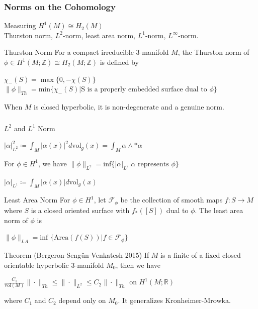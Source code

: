 \documentclass[t]{beamer}
\newcommand{\R}{\mathbb{R}}
\newcommand{\ds}{\displaystyle}
\newcommand{\vol}{\text{vol}}
\begin{document}
\begin{frame}[t]
\frametitle{Norms on the Cohomology}
Measuring $H^1(M) \cong H_2(M)$\\
Thurston norm, $L^2$-norm, least area norm, $L^1$-norm, $L^{\infty}$-norm. 

\begin{block}{Thurston Norm} 
	For a compact irreducible $3$-manifold $M$, the Thurston norm of $\phi \in H^1(M; \mathbb{Z}) \cong H_2(M; \mathbb{Z})$ is defined by 
	\begin{center}
		$\chi_- (S)= \max\{0, -\chi(S)\}$
		$\| \phi \|_{Th}= \text{min}\{\chi_- (S)| \text{S is a properly embedded surface dual to } \phi \}$
	\end{center}
	When $M$ is closed hyperbolic, it is non-degenerate and a genuine norm.
\end{block}
\end{frame}

\begin{frame}[t]
	\frametitle{}
	\begin{block}{$L^2$ and $L^1$ Norm}
		
		\begin{center}
			$\ds |\alpha |_{L^2}^2 \coloneqq \int_M |\alpha(x)|^2 d \text{vol}_g(x) =\int_M \alpha \wedge *\alpha $
		\end{center}
		\begin{center}
			For $\phi \in H^1$, we have $\| \phi  \|_{L^2}= \ds \text{inf} \{ |\alpha |_{L^2}|\alpha \text{ represents } \phi \}$
		\end{center}
	\begin{center}
		$\ds |\alpha |_{L^1} \coloneqq \int_M |\alpha(x)| d \text{vol}_g(x) $
	\end{center}
	\end{block}
\begin{block}{Least Area Norm}
	For $\phi \in H^1$, let $\mathcal{F}_{\phi}$ be the collection of smooth maps $f: S \rightarrow M$ where $S$ is a closed oriented surface with $f_*([S])$ dual to $\phi$. The least area norm of $\phi$ is 
	\begin{center}
		$\|\phi \|_{LA}=\text{inf }\{\text{Area}(f(S))|f\in \mathcal{F}_{\phi}\}$
	\end{center} 
\end{block}
\end{frame}

\begin{frame}[t]
	\begin{block}{Theorem (Bergeron-Seng\"{u}n-Venkatesh 2015)}
		If $M$ is a finite of a fixed closed orientable hyperbolic $3$-manifold $M_0$, then we have \\
		\begin{center}
			$\frac{C_1}{\vol(M)} \|\cdot\|_{Th} \leq \|\cdot \|_{L^2}\leq C_2\|\cdot\|_{Th} \text{ on } H^1(M;\R)$
		\end{center}
		where $C_1$ and $C_2$ depend only on $M_0$. It generalizes Kronheimer-Mrowka. 
	\end{block}
\end{frame}
\end{document}
